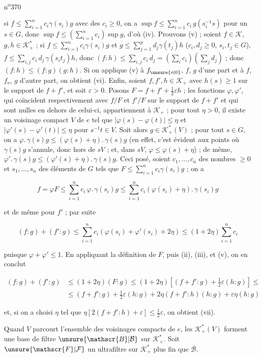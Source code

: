 
 \hfill n\textsuperscript{o}370

si $f\leq\sum\limits_{i=1}^n c_i\gamma(s_i)g$ avec des $c_i\geq0$, on a $\sup f\leq\sum\limits_{i=1}^n c_i\,g(s_i^{-1}s)$ pour un $s\in G$, donc $\sup f\leq(\sum\limits_{i=1}^n c_i)\sup g$, d'où (iv). Prouvons (v) ; soient $f\in\mathcal{K}$, $g,h\in\mathcal{K}_+^*$ ; si $f\leq\sum\limits_{i=1}^n c_i\gamma(s_i)g$ et $g\leq\sum\limits_{j=1}^p d_j\gamma(t_j)h$ ($c_i,d_j\geq0$, $s_i,t_j\in G$), $f\leq\sum\limits_{i,j}c_i\,d_j\,\gamma(s_it_j)h$, donc $(f:h)\leq\sum\limits_{i,j}c_i\,d_j=(\sum\limits_i c_i)(\sum\limits_j d_j)$ ; donc $(f:h)\leq(f:g)(g:h)$. Si on applique (v) à $f_{\unsure{o|0}}$, $f$, $g$ d'une part et à $f$, $f_o$, $g$ d'autre part, on obtient (vi). Enfin, soient $f,f',h\in\mathcal{K}_+$ avec $h(s)\geq1$ sur le support de $f+f'$, et soit $\varepsilon>0$. Posons $F=f+f'+\frac{1}{2}\varepsilon h$ ; les fonctions $\varphi,\varphi'$, qui coïncident respectivement avec $f/F$ et $f'/F$ sur le support de $f+f'$ et qui sont nulles en dehors de celui-ci, appartiennent à $\mathcal{K}_+$ ; pour tout $\eta>0$, il existe un voisinage compact $V$ de $e$ tel que $|\varphi(s)-\varphi(t)|\leq\eta$ et $|\varphi'(s)-\varphi'(t)|\leq\eta$ pour $s^{-1}t\in V$. Soit alors $g\in\mathcal{K}_+^*(V)$ ; pour tout $s\in G$, on a $\varphi.\,\gamma(s)g\leq(\varphi(s)+\eta).\,\gamma(s)g$ (en effet, c'est évident aux points où $\gamma(s)g$ s'annule, donc hors de $sV$ ; et, dans $sV$, $\varphi\leq\varphi(s)+\eta$) ; de même, $\varphi'.\,\gamma(s)g\leq(\varphi'(s)+\eta).\,\gamma(s)g$. Ceci posé, soient $c_1,\ldots,c_n$ des nombres $\geq0$ et $s_1,\ldots,s_n$ des éléments de $G$ tels que $F\leq\sum\limits_{i=1}^n c_i\gamma(s_i)g$ ; on a

\[
f=\varphi F\leq\sum_{i=1}^n c_i\,\varphi.\,\gamma(s_i)g\leq\sum_{i=1}^n c_i(\varphi(s_i)+\eta).\,\gamma(s_i)g
\]

et de même pour $f'$ ; par suite

\[
(f:g)+(f':g)\leq\sum_{i=1}^n c_i(\varphi(s_i)+\varphi'(s_i)+2\eta)\leq(1+2\eta)\sum_{i=1}^n c_i
\]

puisque $\varphi+\varphi'\leq1$. En appliquant la définition de $F$, puis (ii), (iii), et (v), on en conclut

\[
\begin{aligned}
(f:g)+(f':g)&\leq(1+2\eta)(F:g)\leq(1+2\eta)\left[(f+f':g)+\frac{1}{2}\varepsilon(h:g)\right]\leq{}\\
&\leq(f+f':g)+\frac{1}{2}\varepsilon(h:g)+2\eta(f+f':h)(h:g)+\varepsilon\eta(h:g)
\end{aligned}
\]

et, si on a choisi $\eta$ tel que $\eta\left[2(f+f':h)+\varepsilon\right]\leq\frac{1}{2}\varepsilon$, on obtient (vii).

Quand $V$ parcourt l'ensemble des voisinages compacts de $e$, les $\mathcal{K}_+^*(V)$ forment une base de filtre $\unsure{\mathscr{B}|\mathcal{B}}$ sur $\mathcal{K}_+^*$. Soit $\unsure{\mathscr{F}|\mathcal{F}}$ un ultrafiltre sur $\mathcal{K}_+^*$ plus fin que $\mathscr{B}$.
